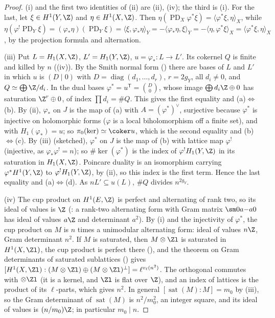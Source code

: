 \begin{proof}
(i) and the first two identities of (ii) are (ii), (iv); the third is (i). For the last, let
$\xi\in H^1(Y,\Z)$ and $\eta\in H^1(X,\Z)$. Then $\eta(\operatorname{PD}_X\varphi^*\xi)=\langle\varphi^*\xi,\eta\rangle_X$, while
$\eta(\varphi^!\operatorname{PD}_Y\xi)=(\varphi_*\eta)(\operatorname{PD}_Y\xi)=\langle\xi,\varphi_*\eta\rangle_Y=-\langle\varphi_*\eta,\xi\rangle_Y=-\langle\eta,\varphi^*\xi\rangle_X=\langle\varphi^*\xi,\eta\rangle_X$, by the projection
formula and alternation.

(iii) Put $L=H_1(X,\Z)$, $L'=H_1(Y,\Z)$, $u=\varphi_*\colon L\to L'$. Its cokernel $Q$ is finite and killed by $n$ ((iv)). By the Smith normal form ()
there are bases of $L$ and $L'$ in which $u$ is $(D\mid0)$ with $D=\operatorname{diag}(d_1,\dots,d_r)$, $r=2g_Y$, all $d_i\ne0$, and $Q\simeq\bigoplus\Z/d_i$. In the dual bases
$\varphi^*=u^{\mathsf T}=\binom D0$, whose image $\bigoplus d_i\Z\oplus0$ has saturation $\Z^r\oplus0$, of index $\prod d_i=\#Q$. This gives the first equality and (a)$\Leftrightarrow$(b).
By (ii), $\varphi_*$ on $J$ is the map of (a) with $A=(\varphi^*)^\vee$, surjective because $\varphi^*$ is injective on holomorphic forms
($\varphi$ is a local biholomorphism off a finite set), and with $H_1(\varphi_*)=u$; so $\pi_0(\ker)\simeq\coker u$, which is the second equality and (b)$\Leftrightarrow$(c). By
(iii) (sketched), $\varphi^*$ on $J$ is the map of (b) with lattice map $\varphi^!$ (injective, as $\varphi_*\varphi^!=n$); so
$\#\ker(\varphi^*)$ is the index of $\varphi^!H_1(Y,\Z)$ in its saturation in $H_1(X,\Z)$. Poincare duality is an isomorphism carrying $\varphi^*H^1(Y,\Z)$ to $\varphi^!H_1(Y,\Z)$, by (ii),
so this index is the first term. Hence the last equality and (a)$\Leftrightarrow$(d). As $nL'\subseteq u(L)$, $\#Q$ divides $n^{2g_Y}$.

(iv) The cup product on $H^1(E,\Z)$ is perfect and alternating of rank two, so its ideal of values is $\Z$ (: a rank-two alternating form with Gram matrix
$\sm0a{-a}0$ has ideal of values $a\Z$ and determinant $a^2$). By (i) and the injectivity of $\varphi^*$, the cup product on $M$ is $n$ times a unimodular alternating form: ideal of
values $n\Z$, Gram determinant $n^2$. If $M$ is saturated, then $M\otimes\Zl$ is saturated in $H^1(X,\Zl)$, the cup product is perfect there (), and the
theorem on Gram determinants of saturated sublattices () gives $[H^1(X,\Zl):(M\otimes\Zl)\oplus(M\otimes\Zl)^\perp]=\ell^{v_\ell(n^2)}$. The orthogonal commutes with
$\otimes\Zl$ (it is a kernel, and $\Zl$ is flat over $\Z$), and an index of lattices is the product of its $\ell$-parts, which gives $n^2$. In general $[\operatorname{sat}(M):M]=m_0$ by (iii),
so the Gram determinant of $\operatorname{sat}(M)$ is $n^2/m_0^2$, an integer square, and its ideal of values is $(n/m_0)\Z$; in particular $m_0\mid n$.


\end{proof}
